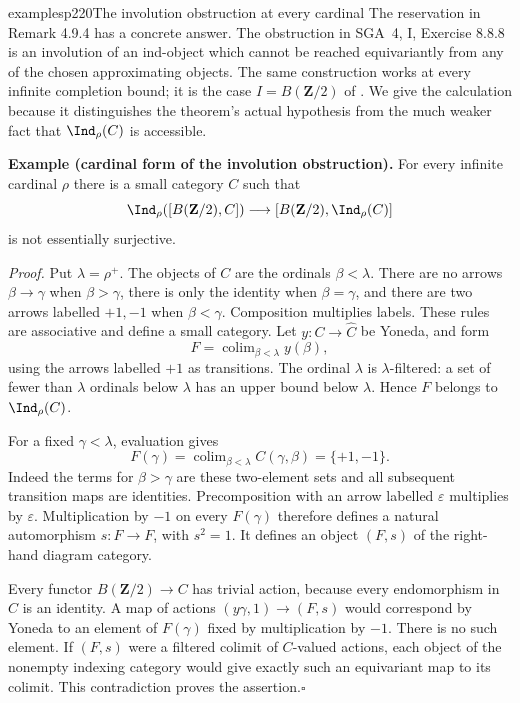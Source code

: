 \begin{dcomment}{examples}{p220}{The involution obstruction at every cardinal}
The reservation in Remark 4.9.4 has a concrete answer.  The obstruction in SGA~4, I, Exercise 8.8.8 is an involution of an ind-object which cannot be reached equivariantly from any of the chosen approximating objects.  The same construction works at every infinite completion bound; it is the case $I=B(\mathbf Z/2)$ of \citet[Example 1.4, Construction 3.1 and Section 3.2]{Henry2025Ind}.  We give the calculation because it distinguishes the theorem's actual hypothesis from the much weaker fact that $\Ind_\rho(C)$ is accessible.

\textbf{Example (cardinal form of the involution obstruction).}
For every infinite cardinal $\rho$ there is a small category $C$ such that
\[
 \Ind_\rho([B(\mathbf Z/2),C])\longrightarrow
 [B(\mathbf Z/2),\Ind_\rho(C)]
\]
is not essentially surjective.

\textit{Proof.} Put $\lambda=\rho^+$.  The objects of $C$ are the ordinals $\beta<\lambda$.  There are no arrows $\beta\to\gamma$ when $\beta>\gamma$, there is only the identity when $\beta=\gamma$, and there are two arrows labelled $+1,-1$ when $\beta<\gamma$.  Composition multiplies labels.  These rules are associative and define a small category.  Let $y:C\to\widehat C$ be Yoneda, and form
\[
 F=\mathop{\operatorname{colim}}_{\beta<\lambda}y(\beta),
\]
using the arrows labelled $+1$ as transitions.  The ordinal $\lambda$ is $\lambda$-filtered: a set of fewer than $\lambda$ ordinals below $\lambda$ has an upper bound below $\lambda$.  Hence $F$ belongs to $\Ind_\rho(C)$.

For a fixed $\gamma<\lambda$, evaluation gives
\[
 F(\gamma)=\mathop{\operatorname{colim}}_{\beta<\lambda}
            C(\gamma,\beta)=\{+1,-1\}.
\]
Indeed the terms for $\beta>\gamma$ are these two-element sets and all subsequent transition maps are identities.  Precomposition with an arrow labelled $\varepsilon$ multiplies by $\varepsilon$.  Multiplication by $-1$ on every $F(\gamma)$ therefore defines a natural automorphism $s:F\to F$, with $s^2=1$.  It defines an object $(F,s)$ of the right-hand diagram category.

Every functor $B(\mathbf Z/2)\to C$ has trivial action, because every endomorphism in $C$ is an identity.  A map of actions $(y\gamma,1)\to(F,s)$ would correspond by Yoneda to an element of $F(\gamma)$ fixed by multiplication by $-1$.  There is no such element.  If $(F,s)$ were a filtered colimit of $C$-valued actions, each object of the nonempty indexing category would give exactly such an equivariant map to its colimit.  This contradiction proves the assertion.\hfill$\square$


\end{dcomment}
